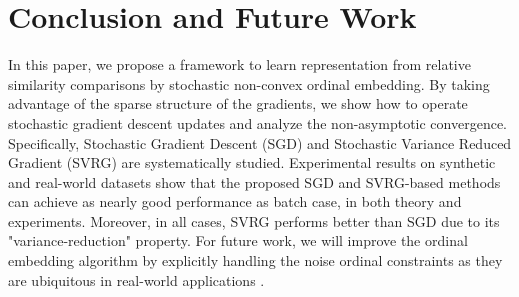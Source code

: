 \documentclass[letterpaper]{article}
\begin{document}
		

		\section{Conclusion and Future Work}

		In this paper, we propose a framework to learn representation from relative similarity comparisons by stochastic non-convex ordinal embedding. By taking advantage of the sparse structure of the gradients, we show how to operate stochastic gradient descent updates and analyze the non-asymptotic convergence. Specifically, Stochastic Gradient Descent (SGD) and
Stochastic Variance Reduced Gradient (SVRG) are systematically studied.  
Experimental results on synthetic and real-world datasets show that the proposed SGD and SVRG-based methods can achieve as nearly good performance as batch
case, in both theory and experiments. Moreover, in all cases, SVRG performs better than SGD due to its "variance-reduction" property. 
For future work, we will improve the ordinal embedding algorithm by explicitly handling the noise ordinal constraints as they are ubiquitous in real-world applications \cite{2014arXiv1408.3467X}.  
 


		
		

	
\end{document}
